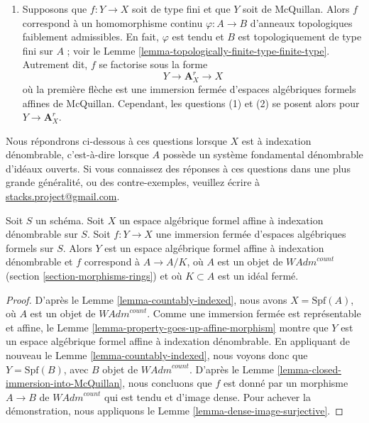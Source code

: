 \begin{remark}
\begin{enumerate}
Cependant, il n'est pas clair que les projections
$\lim B_\lambda \to B_\lambda$ soient surjectives ; autrement dit,
il n'est pas clair que $Y$ soit de McQuillan.
Existe-t-il un exemple où $Y$ n'est pas de McQuillan ?
\item Supposons que $f : Y \to X$ soit de type fini et que $Y$ soit de McQuillan.
Alors $f$ correspond à un homomorphisme continu $\varphi : A \to B$ d'anneaux topologiques
faiblement admissibles. En fait, $\varphi$ est tendu et
$B$ est topologiquement de type fini sur $A$ ; voir le
Lemme \ref{lemma-topologically-finite-type-finite-type}.
Autrement dit, $f$ se factorise sous la forme
$$
Y \longrightarrow \mathbf{A}^r_X \longrightarrow X
$$
où la première flèche est une immersion fermée d'espaces algébriques formels
affines de McQuillan. Cependant, les questions (1) et
(2) se posent alors pour $Y \to \mathbf{A}^r_X$.
\end{enumerate}
Nous répondrons ci-dessous à ces questions lorsque
$X$ est à indexation dénombrable, c'est-à-dire lorsque $A$ possède un système fondamental
dénombrable d'idéaux ouverts. Si vous connaissez des réponses à ces questions
dans une plus grande généralité, ou des contre-exemples, veuillez écrire à
\href{mailto:stacks.project@gmail.com}{stacks.project@gmail.com}.
\end{remark}

\begin{lemma}
\label{lemma-closed-immersion-into-countably-indexed}
Soit $S$ un schéma. Soit $X$ un espace algébrique formel affine à indexation
dénombrable sur $S$. Soit $f : Y \to X$ une immersion fermée d'espaces algébriques
formels sur $S$. Alors $Y$ est un espace algébrique formel affine à indexation dénombrable
et $f$ correspond à $A \to A/K$, où $A$ est un objet de
$\textit{WAdm}^{count}$
(section \ref{section-morphisms-rings})
et où $K \subset A$ est un idéal fermé.
\end{lemma}

\begin{proof}
D'après le Lemme \ref{lemma-countably-indexed},
nous avons $X = \text{Spf}(A)$, où $A$ est un objet de
$\textit{WAdm}^{count}$. Comme une immersion fermée est représentable
et affine, le Lemme \ref{lemma-property-goes-up-affine-morphism} montre
que $Y$ est un espace algébrique formel affine à indexation dénombrable.
En appliquant de nouveau le Lemme \ref{lemma-countably-indexed},
nous voyons donc que $Y = \text{Spf}(B)$, avec $B$ objet de
$\textit{WAdm}^{count}$. D'après le Lemme \ref{lemma-closed-immersion-into-McQuillan},
nous concluons que $f$ est donné par un morphisme $A \to B$ de
$\textit{WAdm}^{count}$ qui est tendu et d'image dense.
Pour achever la démonstration, nous appliquons le
Lemme \ref{lemma-dense-image-surjective}.
\end{proof}

